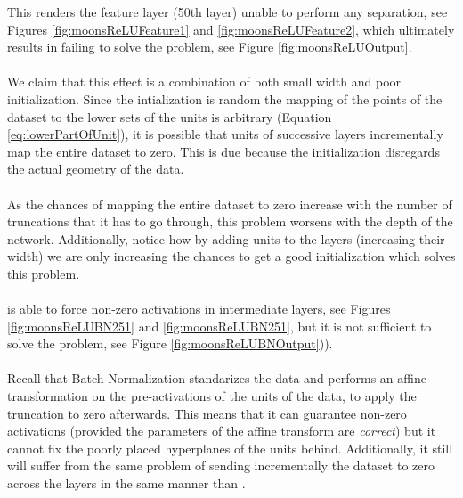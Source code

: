This renders the feature layer (50th layer) unable to perform any separation, see Figures \ref{fig:moonsReLUFeature1} and \ref{fig:moonsReLUFeature2}, which ultimately results in failing to solve the problem, see Figure \ref{fig:moonsReLUOutput}. 
\\\\
We claim that this effect is a combination of both small width and poor initialization. Since the intialization is random the mapping of the points of the dataset to the lower sets of the units is arbitrary (Equation \ref{eq:lowerPartOfUnit}), it is possible that units of successive layers incrementally map the entire dataset to zero. This is due because the initialization disregards the actual geometry of the data. 
\\\\
As the chances of mapping the entire dataset to zero increase with the number of truncations that it has to go through, this problem worsens with the depth of the network. Additionally, notice how by adding units to the layers (increasing their width) we are only increasing the chances to get a good initialization which solves this problem.
\\\\
\ReLUBN is able to force non-zero activations in intermediate layers, see Figures \ref{fig:moonsReLUBN251} and \ref{fig:moonsReLUBN251}, but it is not sufficient to solve the problem, see Figure \ref{fig:moonsReLUBNOutput})). 
\\\\
 Recall that Batch Normalization standarizes the data and performs an affine transformation on the pre-activations of the units of the data, to apply the truncation to zero afterwards. This means that it can guarantee non-zero activations (provided the parameters of the affine transform are \emph{correct}) but it cannot fix the poorly placed hyperplanes of the units behind. Additionally, it still will suffer from the same problem of sending incrementally the dataset to zero across the layers in the same manner than \ReLU.
 \\\\
 
